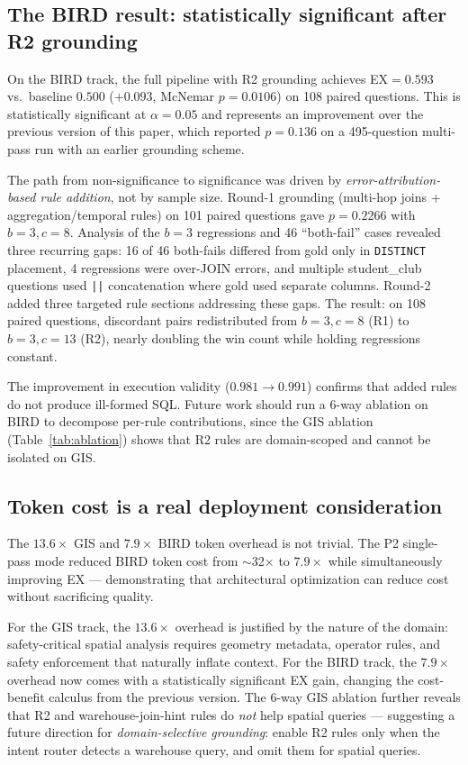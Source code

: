 \documentclass[11pt]{article}
\begin{document}
\subsection{The BIRD result: statistically significant after R2 grounding}

On the BIRD track, the full pipeline with R2 grounding achieves EX$=0.593$ vs.\ baseline $0.500$ ($+0.093$, McNemar $p=0.0106$) on 108 paired questions. This is statistically significant at $\alpha=0.05$ and represents an improvement over the previous version of this paper, which reported $p=0.136$ on a 495-question multi-pass run with an earlier grounding scheme.

The path from non-significance to significance was driven by \emph{error-attribution-based rule addition}, not by sample size. Round-1 grounding (multi-hop joins + aggregation/temporal rules) on 101 paired questions gave $p=0.2266$ with $b=3, c=8$. Analysis of the $b=3$ regressions and 46 ``both-fail'' cases revealed three recurring gaps: 16 of 46 both-fails differed from gold only in \texttt{DISTINCT} placement, 4 regressions were over-JOIN errors, and multiple student\_club questions used \texttt{||} concatenation where gold used separate columns. Round-2 added three targeted rule sections addressing these gaps. The result: on 108 paired questions, discordant pairs redistributed from $b=3, c=8$ (R1) to $b=3, c=13$ (R2), nearly doubling the win count while holding regressions constant.

The improvement in execution validity ($0.981 \to 0.991$) confirms that added rules do not produce ill-formed SQL. Future work should run a 6-way ablation on BIRD to decompose per-rule contributions, since the GIS ablation (Table~\ref{tab:ablation}) shows that R2 rules are domain-scoped and cannot be isolated on GIS.

\subsection{Token cost is a real deployment consideration}

The $13.6\times$ GIS and $7.9\times$ BIRD token overhead is not trivial. The P2 single-pass mode reduced BIRD token cost from $\sim$32$\times$ to $7.9\times$ while simultaneously improving EX --- demonstrating that architectural optimization can reduce cost without sacrificing quality.

For the GIS track, the $13.6\times$ overhead is justified by the nature of the domain: safety-critical spatial analysis requires geometry metadata, operator rules, and safety enforcement that naturally inflate context. For the BIRD track, the $7.9\times$ overhead now comes with a statistically significant EX gain, changing the cost-benefit calculus from the previous version. The 6-way GIS ablation further reveals that R2 and warehouse-join-hint rules do \emph{not} help spatial queries --- suggesting a future direction for \emph{domain-selective grounding}: enable R2 rules only when the intent router detects a warehouse query, and omit them for spatial queries.
\end{document}
